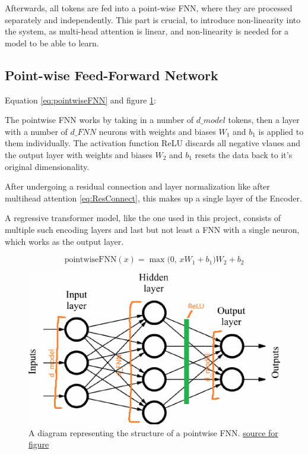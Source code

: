 \documentclass{article}
\begin{document}
Afterwards, all tokens are fed into a point-wise FNN, where they are processed 
separately and independently. This part is crucial, to introduce non-linearity 
into the system, as multi-head attention is linear, and non-linearity is needed 
for a model to be able to learn.

\subsection{Point-wise Feed-Forward Network}


Equation \eqref{eq:pointwiseFNN} and figure \ref{fig:pointwiseFNN}:

The pointwise FNN works by taking in a number of $d\_model$ tokens, then a 
layer with a number of $d\_FNN$ neurons with weights and biases $W_1$ and $b_1$ 
is applied to them individually. The activation function ReLU discards all 
negative vlaues and the output layer with weights and biases $W_2$ and $b_1$ 
resets the data back to it's original dimensionality.

After undergoing a residual connection and layer normalization like after 
multihead attention \eqref{eq:ResConnect}, this makes up a single layer of the 
Encoder.

A regressive transformer model, like the one used in this project, consists of 
multiple such encoding layers and last but not least a FNN with a single neuron, 
which works as the output layer.

\begin{equation}
    \text{pointwiseFNN}(x) = \max\bigl(0, \, x W_1 + b_1 \bigr) W_2 + b_2 \label{eq:pointwiseFNN}
\end{equation}

\begin{figure}[htbp]
    \centering
    \includegraphics[width=0.4\paperwidth]{images/pointwiseFNN.png}
    \caption{A diagram representing the structure of a pointwise FNN. \href{https://datascience.stackexchange.com/questions/68020/what-is-the-feedforward-network-in-a-transformer-trained-on}
    {source for figure}}
    \label{fig:pointwiseFNN}
\end{figure}
\end{document}
